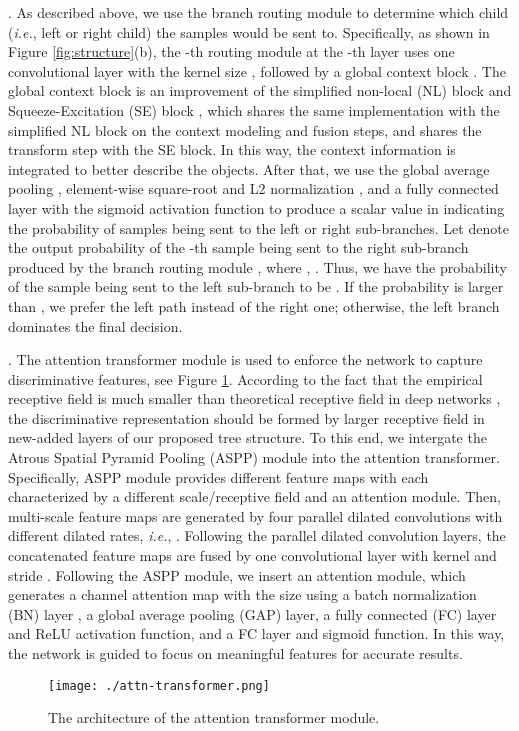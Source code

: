 \documentclass[10pt,twocolumn,letterpaper]{article}
\def\ie{{\em i.e.}}
\begin{document}
{}. As described above, we use the branch routing module to determine which child (\ie, left or right child) the samples would be sent to. Specifically, as shown in Figure \ref{fig:structure}(b), the -th routing module  at the -th layer uses one convolutional layer with the kernel size , followed by a global context block \cite{DBLP:journals/corr/abs-1904-11492}. The global context block is an improvement of the simplified non-local (NL) block \cite{DBLP:conf/cvpr/0004GGH18} and Squeeze-Excitation (SE) block \cite{DBLP:conf/cvpr/HuSS18}, which shares the same implementation with the simplified NL block on the context modeling and fusion steps, and shares the transform step with the SE block. In this way, the context information is integrated to better describe the objects. After that, we use the global average pooling \cite{DBLP:journals/corr/LinCY13}, element-wise square-root and L2 normalization \cite{DBLP:conf/bmvc/LinM17}, and a fully connected layer with the sigmoid activation function to produce a scalar value in  indicating the probability of samples being sent to the left or right sub-branches. Let  denote the output probability of the -th sample  being sent to the right sub-branch produced by the branch routing module , where , . Thus, we have the probability of the sample  being sent to the left sub-branch to be . If the probability  is larger than , we prefer the left path instead of the right one; otherwise, the left branch dominates the final decision. 

{.} The attention transformer module is used to enforce the network to capture discriminative features, see Figure \ref{fig:attn-transformer}. According to the fact that the empirical receptive field is much smaller than theoretical receptive field in deep networks \cite{DBLP:journals/corr/LiuRB15}, the discriminative representation should be formed by larger receptive field in new-added layers of our proposed tree structure. To this end, we intergate the Atrous Spatial Pyramid Pooling (ASPP) module \cite{DBLP:journals/pami/ChenPKMY18} into the attention transformer. Specifically, ASPP module provides different feature maps with each characterized by a different scale/receptive field and an attention module. Then, multi-scale feature maps are generated by four parallel dilated convolutions with different dilated rates, \ie, . Following the parallel dilated convolution layers, the concatenated feature maps are fused by one convolutional layer with kernel  and stride . Following the ASPP module, we insert an attention module, which generates a channel attention map with the size  using a batch normalization (BN) layer \cite{DBLP:conf/icml/IoffeS15}, a global average pooling (GAP) layer, a fully connected (FC) layer and ReLU activation function, and a FC layer and sigmoid function. In this way, the network is guided to focus on meaningful features for accurate results.
\begin{figure}[t]
\centering
\texttt{[image: ./attn-transformer.png]}
\caption{The architecture of the attention transformer module.}
\vspace{-2mm}
\label{fig:attn-transformer}
\end{figure}
\end{document}
